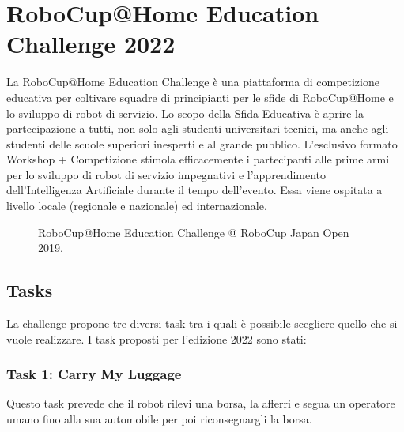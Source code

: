 \documentclass[italian, twoside]{sapthesis} %
\begin{document}
\chapter{RoboCup@Home Education Challenge 2022}
\label{chap:1} 
\lettrine[lines=2, findent=3pt, nindent=0pt]{L}{}a RoboCup@Home Education Challenge è una piattaforma di competizione educativa per coltivare squadre di principianti per le sfide di RoboCup@Home e lo sviluppo di robot di servizio. Lo scopo della Sfida Educativa è aprire la partecipazione a tutti, non solo agli studenti universitari tecnici, ma anche agli studenti delle scuole superiori inesperti e al grande pubblico. L'esclusivo formato Workshop + Competizione stimola efficacemente i partecipanti alle prime armi per lo sviluppo di robot di servizio impegnativi e l'apprendimento dell'Intelligenza Artificiale durante il tempo dell'evento. Essa viene ospitata a livello locale (regionale e nazionale) ed internazionale.

\begin{figure}[H]
    \centering
    \caption{RoboCup@Home Education Challenge @ RoboCup Japan Open 2019.}
    \label{fig:robocup.jpg}
\end{figure}

\section{Tasks}
La challenge propone tre diversi task tra i quali è possibile scegliere quello che si vuole realizzare. I task proposti per l'edizione 2022 sono stati:

\subsection{Task 1: Carry My Luggage}
Questo task prevede che il robot rilevi una borsa, la afferri e segua un operatore umano fino alla sua automobile per poi riconsegnargli la borsa.
\end{document}
